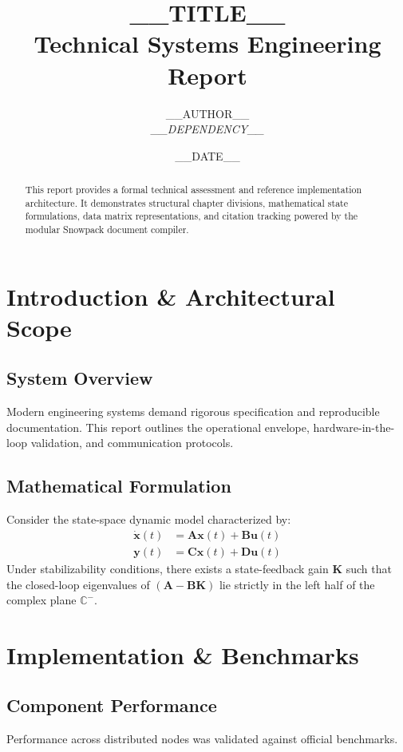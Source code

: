 \documentclass[11pt, a4paper]{report}
\title{\textbf{__TITLE__}\\ \large Technical Systems Engineering Report}
\author{__AUTHOR__ \\ \large \textit{__DEPENDENCY__}}
\date{__DATE__}
\begin{document}
\maketitle

\begin{abstract}
This report provides a formal technical assessment and reference implementation architecture. It demonstrates structural chapter divisions, mathematical state formulations, data matrix representations, and citation tracking powered by the modular Snowpack document compiler.
\end{abstract}

\tableofcontents
\newpage

\chapter{Introduction \& Architectural Scope}

\section{System Overview}
Modern engineering systems demand rigorous specification and reproducible documentation. This report outlines the operational envelope, hardware-in-the-loop validation, and communication protocols.

\section{Mathematical Formulation}
Consider the state-space dynamic model characterized by:
\begin{align}
    \dot{\mathbf{x}}(t) &= \mathbf{A}\mathbf{x}(t) + \mathbf{B}\mathbf{u}(t) \\
    \mathbf{y}(t)       &= \mathbf{C}\mathbf{x}(t) + \mathbf{D}\mathbf{u}(t)
\end{align}
Under stabilizability conditions, there exists a state-feedback gain $\mathbf{K}$ such that the closed-loop eigenvalues of $(\mathbf{A} - \mathbf{B}\mathbf{K})$ lie strictly in the left half of the complex plane $\mathbb{C}^-$.

\chapter{Implementation \& Benchmarks}

\section{Component Performance}
Performance across distributed nodes was validated against official benchmarks.
\end{document}
